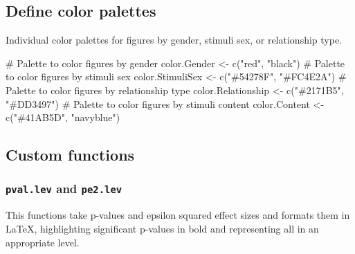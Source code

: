 \documentclass[
  bookmarksnumbered]{article}
\newenvironment{Shaded}{\begin{snugshade}}{\end{snugshade}}
\newcommand{\CommentTok}[1]{\textcolor[rgb]{0.50,0.62,0.50}{#1}}
\newcommand{\FunctionTok}[1]{\textcolor[rgb]{0.94,0.94,0.56}{#1}}
\newcommand{\NormalTok}[1]{\textcolor[rgb]{0.80,0.80,0.80}{#1}}
\newcommand{\OtherTok}[1]{\textcolor[rgb]{0.94,0.94,0.56}{#1}}
\newcommand{\StringTok}[1]{\textcolor[rgb]{0.80,0.58,0.58}{#1}}
\begin{document}
\subsection{Define color palettes}\label{define-color-palettes}

Individual color palettes for figures by gender, stimuli sex, or relationship type.

\begin{Shaded}
\begin{Highlighting}[]
\CommentTok{\# Palette to color figures by gender}
\NormalTok{color.Gender }\OtherTok{\textless{}{-}} \FunctionTok{c}\NormalTok{(}\StringTok{"red"}\NormalTok{, }\StringTok{"black"}\NormalTok{)}
\CommentTok{\# Palette to color figures by stimuli sex}
\NormalTok{color.StimuliSex }\OtherTok{\textless{}{-}} \FunctionTok{c}\NormalTok{(}\StringTok{"\#54278F"}\NormalTok{, }\StringTok{"\#FC4E2A"}\NormalTok{)}
\CommentTok{\# Palette to color figures by relationship type}
\NormalTok{color.Relationship }\OtherTok{\textless{}{-}} \FunctionTok{c}\NormalTok{(}\StringTok{"\#2171B5"}\NormalTok{, }\StringTok{"\#DD3497"}\NormalTok{)}
\CommentTok{\# Palette to color figures by stimuli content}
\NormalTok{color.Content }\OtherTok{\textless{}{-}} \FunctionTok{c}\NormalTok{(}\StringTok{"\#41AB5D"}\NormalTok{, }\StringTok{"navyblue"}\NormalTok{) }
\end{Highlighting}
\end{Shaded}

\subsection{Custom functions}\label{custom-functions}

\subsubsection{\texorpdfstring{\texttt{pval.lev} and \texttt{pe2.lev}}{pval.lev and pe2.lev}}\label{pval.lev-and-pe2.lev}

This functions take p-values and epsilon squared effect sizes and formats them in \LaTeX, highlighting significant p-values in bold and representing all in an appropriate level.
\end{document}
